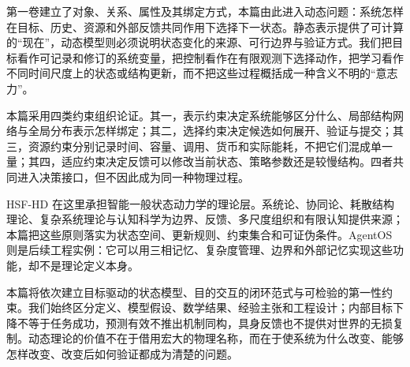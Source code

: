 \label{part:dynamic_process}


第一卷建立了对象、关系、属性及其绑定方式，本篇由此进入动态问题：系统怎样在目标、历史、资源和外部反馈共同作用下选择下一状态。静态表示提供了可计算的“现在”，动态模型则必须说明状态变化的来源、可行边界与验证方式。我们把目标看作可记录和修订的系统变量，把控制看作在有限观测下选择动作，把学习看作不同时间尺度上的状态或结构更新，而不把这些过程概括成一种含义不明的“意志力”。

本篇采用四类约束组织论证。其一，表示约束决定系统能够区分什么、局部结构网络与全局分布表示怎样绑定；其二，选择约束决定候选如何展开、验证与提交；其三，资源约束分别记录时间、容量、调用、货币和实际能耗，不把它们混成单一量；其四，适应约束决定反馈可以修改当前状态、策略参数还是较慢结构。四者共同进入决策接口，但不因此成为同一种物理过程。

HSF-HD 在这里承担智能一般状态动力学的理论层。系统论、协同论、耗散结构理论、复杂系统理论与认知科学为边界、反馈、多尺度组织和有限认知提供来源；本篇把这些原则落实为状态空间、更新规则、约束集合和可证伪条件。AgentOS 则是后续工程实例：它可以用三相记忆、复杂度管理、边界和外部记忆实现这些功能，却不是理论定义本身。

本篇将依次建立目标驱动的状态模型、目的交互的闭环范式与可检验的第一性约束。我们始终区分定义、模型假设、数学结果、经验主张和工程设计；内部目标下降不等于任务成功，预测有效不推出机制同构，具身反馈也不提供对世界的无损复制。动态理论的价值不在于借用宏大的物理名称，而在于使系统为什么改变、能够怎样改变、改变后如何验证都成为清楚的问题。
